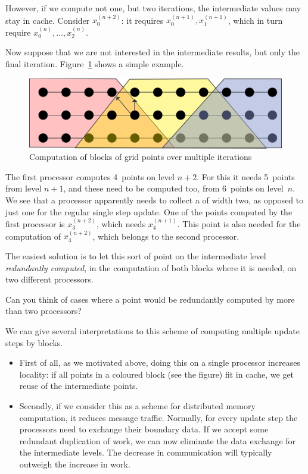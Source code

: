 However,
if we compute not one, but two iterations, the intermediate values
may stay in cache.
Consider $x^{(n+2)}_0$: it requires $x^{(n+1)}_0,x^{(n+1)}_1$,
which in turn require $x^{(n)}_0,\ldots,x^{(n)}_2$.

Now suppose that we are not interested in the intermediate results, but
only the final iteration. Figure~\ref{fig:grid-update-overlap} shows
a simple example.
\begin{figure}[ht]
\includegraphics[scale=.1]{graphics/grid-update-overlap}
\caption{Computation of blocks of grid points over multiple iterations}
\label{fig:grid-update-overlap}
\end{figure}
The first processor computes 4~points on level $n+2$. For this it needs 5~points
from level $n+1$, and these need to be computed too, from 6~points on level~$n$.
We see that a processor apparently needs to collect a 
of width two, as opposed to just one for the regular single step update.
One of the points computed by the first processor is $x^{(n+2)}_3$,
which needs $x^{(n+1)}_4$. This point is also needed for the computation
of $x^{(n+2)}_4$, which belongs to the second processor.

The easiest solution is to let this sort of point on the intermediate
level \emph{redundantly computed}, in 
the computation of both blocks where it is needed, on two different processors.

\begin{exercise}
  Can you think of cases where a point would be redundantly computed by
  more than two processors?
\end{exercise}

We can give several interpretations to this scheme of computing multiple
update steps by blocks. 
\begin{itemize}
\item First of all, as we motivated above, doing this 
on a single processor increases locality: if all points in a coloured block
(see the figure) fit in cache, we get reuse of the intermediate points.
\item Secondly, if we consider this as a scheme for distributed memory computation,
it reduces message traffic. Normally, for every update step the processors
need to exchange their boundary data. If we accept some redundant duplication
of work, we can now eliminate the data exchange for the intermediate levels.
The decrease in communication will typically outweigh the increase in work.
\end{itemize}

